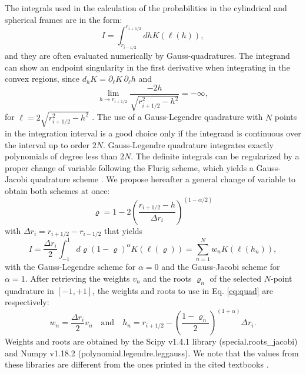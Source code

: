 \documentclass{ictt26}
\begin{document}
The integrals used in the calculation of the probabilities in the cylindrical and spherical frames are in the form:
\[
  I = \int_{r_{i-1/2}}^{r_{i+1/2}}{dh K(\ell(h))},
\]
and they are often evaluated numerically by Gauss-quadratures. The integrand can show an endpoint singularity in the first derivative when integrating in the convex regions, since $d_h K = \partial_{\ell} K\, \partial_{\ell}h$ and 
\[
  \lim_{h \rightarrow r_{i+1/2}}
    \frac{-2h}{\sqrt{r_{i+1/2}^2 - h^2}} = -\infty,
\]
for $\ell = 2\sqrt{r_{i+1/2}^2 - h^2}$ \cite{hebert2009applied}.
The use of a Gauss-Legendre quadrature with $N$ points in the integration interval is a good choice only if the integrand is continuous over the interval up to order $2N$. Gauss-Legendre quadrature integrates exactly polynomials of degree less than $2N$. The definite integrals can be regularized by a proper change of variable following the Flurig scheme, which yields a Gauss-Jacobi quadrature scheme \cite{carlvik1966integral}. We propose hereafter a general change of variable to obtain both schemes at once:
\begin{equation}
\label{eq:varchange}
  \varrho = 1 - 2 \left(
      \frac{r_{i+1/2} - h}{\Delta r_i} \right)^{(1-\alpha/2)}
\end{equation}
with $\Delta r_i = r_{i+1/2} - r_{i-1/2}$ that yields
\begin{equation}
\label{eq:quad}
  I = \frac{\Delta r_i}{2}\int_{-1}^{1}{
    d\varrho (1-\varrho)^\alpha
             K(\ell(\varrho))}
    = \sum_{n=1}^N{w_n K(\ell(h_n))},
\end{equation}
with the Gauss-Legendre scheme for $\alpha = 0$ and the Gauss-Jacobi scheme for $\alpha = 1$. %
After retrieving the weights $v_n$ and the roots $\varrho_n$ of the selected $N$-point quadrature in $[-1, +1]$, the weights and roots to use in Eq. \ref{eq:quad} are respectively:
\begin{equation}
\label{eq:wnrn}
  w_n = \frac{\Delta r_i}{2} v_n \quad \text{and} \quad
  h_n = r_{i+1/2}
      - \left(\frac{1-\varrho_n}{2}\right)^{(1+\alpha)}
        \Delta r_i.        
\end{equation}
Weights and roots are obtained by the Scipy v1.4.1 library (special.roots\_jacobi) and Numpy v1.18.2 (polynomial.legendre.leggauss). We note that the values from these libraries are different from the ones printed in the cited textbooks \cite{hebert2009applied,stamm1983methods}.
\end{document}
